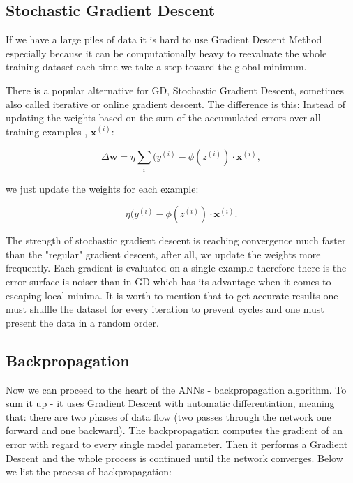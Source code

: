 \documentclass[a4paper,oneside,openright,11pt]{book}
\begin{document}
\subsection{Stochastic Gradient Descent}

If we have a large piles of data it is hard to use Gradient Descent Method especially because it can be computationally heavy to reevaluate the whole training dataset each time we take a step toward the global minimum.

There is a popular alternative for GD, Stochastic Gradient Descent, sometimes also called iterative or online gradient descent. The difference is this: Instead of updating the weights based on the sum of the accumulated errors over all training examples , $\textbf{x}^{(i)}$:

\begin{equation}
    \Delta \textbf{w} = \eta \sum_{i}^{}(y^{(i)} - \phi(z^{(i)}) \cdot \textbf{x}^{(i)},
\end{equation}


we just update the weights for each example:

\begin{equation}
    \eta (y^{(i)} - \phi(z^{(i)}) \cdot \textbf{x}^{(i)}.
\end{equation}

The strength of stochastic gradient descent is reaching convergence much faster than the "regular" gradient descent, after all, we update the weights more frequently. Each gradient is evaluated on a single example therefore there is the error surface is noiser than in GD which has its advantage when it comes to escaping local minima. It is worth to mention that to get accurate results one must shuffle the dataset for every iteration to prevent cycles and one must present the data in a random order. \cite{raschka}

\subsection{Backpropagation}

Now we can proceed to the heart of the ANNs - backpropagation algorithm. To sum it up - it uses Gradient Descent with automatic differentiation, meaning that: there are two phases of data flow (two passes through the network one forward and one backward). The backpropagation computes the gradient of an error with regard to every single model parameter. Then it performs a Gradient Descent and the whole process is continued until the network converges. Below we list the process of backpropagation:
\end{document}

